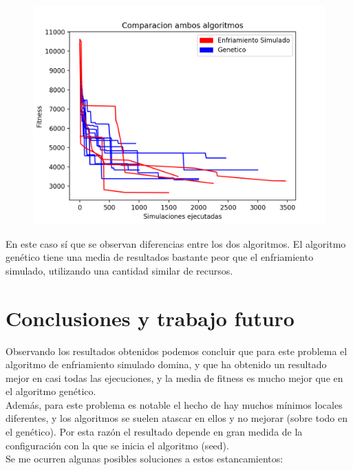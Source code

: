 \documentclass[a4paper, 11pt]{article}
\begin{document}
	 		\begin{figure}[htb!]
	 		\begin{minipage}{0.8\textwidth}
	 			\centering
	 			\includegraphics[scale=1]{images/comparacion_ambos}
	 			\label{fig:comparacion_ambos}
	 		\end{minipage}\hfill
	 	\end{figure}

	En este caso sí que se observan diferencias entre los dos algoritmos. El algoritmo genético tiene una media de resultados bastante peor que el enfriamiento simulado, utilizando una cantidad similar de recursos. 
	
\section{Conclusiones y trabajo futuro}
	Observando los resultados obtenidos podemos concluir que para este problema el algoritmo de enfriamiento simulado domina, y que ha obtenido un resultado mejor en casi todas las ejecuciones, y la media de fitness es mucho mejor que en el algoritmo genético. \\
	
	Además, para este problema es notable el hecho de hay muchos mínimos locales diferentes, y los algoritmos se suelen atascar en ellos y no mejorar (sobre todo en el genético). Por esta razón el resultado depende en gran medida de la configuración con la que se inicia el algoritmo (seed). \\

	Se me ocurren algunas posibles soluciones a estos estancamientos:
	
\end{document}
